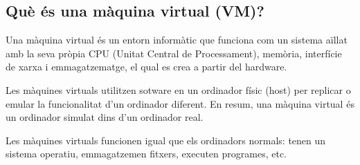 \subsection{Què és una màquina virtual (VM)?}
Una màquina virtual és un entorn informàtic que funciona com un sistema aïllat amb la seva pròpia CPU (Unitat Central de Processament), memòria, interfície de xarxa i emmagatzematge, el qual es crea a partir del hardware.


Les màquines virtuals utilitzen sotware en un ordinador físic (host) per replicar o emular la funcionalitat d’un ordinador diferent. En resum, una màquina virtual és un ordinador simulat dins d’un ordinador real.

Les màquines virtuals funcionen igual que els ordinadors normals: tenen un sistema operatiu, emmagatzemen fitxers, executen programes, etc.

